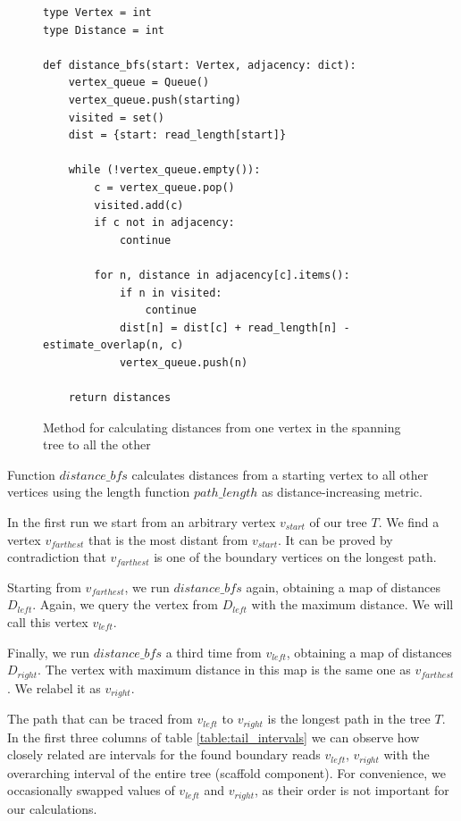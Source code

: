 \begin{figure}[H]
\lstset{language=Python}
\begin{lstlisting}[basicstyle=\small]
type Vertex = int
type Distance = int

def distance_bfs(start: Vertex, adjacency: dict):
    vertex_queue = Queue()
    vertex_queue.push(starting)
    visited = set()
    dist = {start: read_length[start]}

    while (!vertex_queue.empty()):
        c = vertex_queue.pop()
        visited.add(c)
        if c not in adjacency:
            continue

        for n, distance in adjacency[c].items():
            if n in visited:
                continue
            dist[n] = dist[c] + read_length[n] - estimate_overlap(n, c)
            vertex_queue.push(n)

    return distances

\end{lstlisting}
\caption{Method for calculating distances from one vertex in the spanning tree to all the other}
\label{fig:distance_bfs}
\end{figure}

Function $distance\_bfs$ calculates distances from a starting vertex to all other vertices using the length function $path\_length$ as distance-increasing metric.

In the first run we start from an arbitrary vertex $v_{start}$ of our tree $T$. We find a vertex $v_{farthest}$ that is the most distant from $v_{start}$. It can be proved by contradiction that $v_{farthest}$ is one of the boundary vertices on the longest path.

Starting from $v_{farthest}$, we run $distance\_bfs$ again, obtaining a map of distances $D_{left}$. Again, we query the vertex from $D_{left}$ with the maximum distance. We will call this vertex $v_{left}$.

Finally, we run $distance\_bfs$ a third time from $v_{left}$, obtaining a map of distances $D_{right}$. The vertex with maximum distance in this map is the same one as $v_{farthest}$. We relabel it as $v_{right}$. 

The path that can be traced from $v_{left}$ to $v_{right}$ is the longest path in the tree $T$.
In the first three columns of table \ref{table:tail_intervals} we can observe how closely related are intervals for the found boundary reads $v_{left}$, $v_{right}$ with the overarching interval of the entire tree (scaffold component). For convenience, we occasionally swapped values of $v_{left}$ and $v_{right}$, as their order is not important for our calculations.

